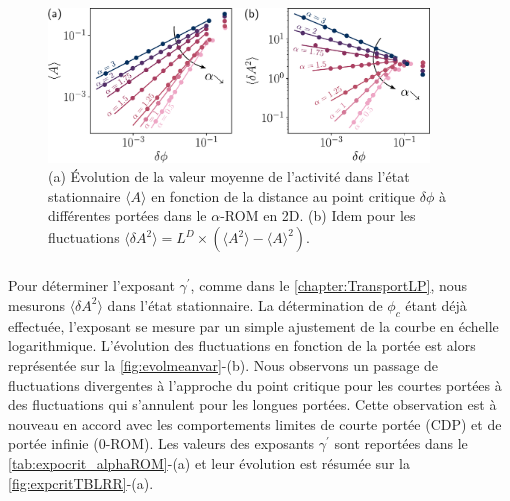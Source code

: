 \begin{figure}[h]
	\centering
	\includegraphics[width=0.9\textwidth]{Chapitre3/Figures/BetaGamma/EvolMeanVar_edited.pdf}
	\caption{(a) Évolution de la valeur moyenne de l'activité dans l'état stationnaire $\langle A \rangle$ en fonction de la distance au point critique $\delta\phi$ à différentes portées dans le $\alpha$-ROM en 2D. (b) Idem pour les fluctuations $\langle \delta A^2\rangle = L^D\times(\langle A ^2 \rangle - \langle A \rangle^2)$.}
	\label{fig:evolmeanvar}
\end{figure}

\subparagraph{}Pour déterminer l'exposant $\gamma^\prime$, comme dans le \autoref{chapter:TransportLP}, nous mesurons $\langle \delta A^2\rangle$ dans l'état stationnaire. La détermination de $\phi_c$ étant déjà effectuée, l'exposant se mesure par un simple ajustement de la courbe en échelle logarithmique. L'évolution des fluctuations en fonction de la portée est alors représentée sur la \autoref{fig:evolmeanvar}-(b). Nous observons un passage de fluctuations divergentes à l'approche du point critique pour les courtes portées à des fluctuations qui s'annulent pour les longues portées. Cette observation est à nouveau en accord avec les comportements limites de courte portée (CDP) et de portée infinie ($0$-ROM). Les valeurs des exposants $\gamma^\prime$ sont reportées dans le \autoref{tab:expocrit_alphaROM}-(a) et leur évolution est résumée sur la \autoref{fig:expcritTBLRR}-(a).

